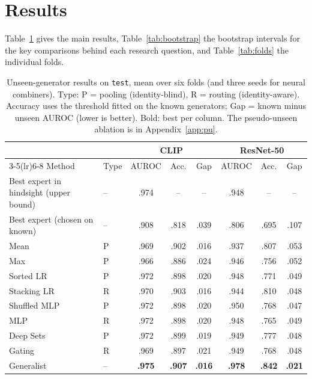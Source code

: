 \documentclass[10pt,a4paper]{article}
\begin{document}
\section{Results}\label{sec:results}

Table~\ref{tab:main} gives the main results, Table~\ref{tab:bootstrap} the bootstrap intervals for the key comparisons behind each research question, and Table~\ref{tab:folds} the individual folds.

\begin{table}[t]
\centering
\small
\setlength{\tabcolsep}{5pt}
\begin{tabular}{llcccccc}
\toprule
 & & \multicolumn{3}{c}{CLIP} & \multicolumn{3}{c}{ResNet-50} \\
\cmidrule(lr){3-5}\cmidrule(lr){6-8}
Method & Type & AUROC & Acc. & Gap & AUROC & Acc. & Gap \\
\midrule
Best expert in hindsight (upper bound) & -- & .974 & -- & -- & .948 & -- & -- \\
Best expert (chosen on known) & -- & .908 & .818 & .039 & .806 & .695 & .107 \\
\midrule
Mean & P & .969 & .902 & .016 & .937 & .807 & .053 \\
Max & P & .966 & .886 & .024 & .946 & .756 & .052 \\
Sorted LR & P & .972 & .898 & .020 & .948 & .771 & .049 \\
Stacking LR & R & .970 & .903 & .016 & .944 & .810 & .048 \\
Shuffled MLP & P & .972 & .898 & .020 & .950 & .768 & .047 \\
MLP & R & .972 & .898 & .020 & .948 & .765 & .049 \\
Deep Sets & P & .972 & .899 & .019 & .949 & .777 & .048 \\
Gating & R & .969 & .897 & .021 & .949 & .768 & .048 \\
\midrule
Generalist & -- & \textbf{.975} & \textbf{.907} & \textbf{.016} & \textbf{.978} & \textbf{.842} & \textbf{.021} \\
\bottomrule
\end{tabular}
\caption{Unseen-generator results on \texttt{test}, mean over six folds (and three seeds for neural combiners). Type: P = pooling (identity-blind), R = routing (identity-aware). Accuracy uses the threshold fitted on the known generators; Gap = known minus unseen AUROC (lower is better). Bold: best per column. The pseudo-unseen ablation is in Appendix~\ref{app:pu}.}
\label{tab:main}
\end{table}
\end{document}
